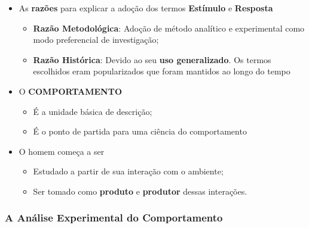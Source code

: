 \documentclass[
]{book}
\providecommand{\tightlist}{%
  \setlength{\itemsep}{0pt}\setlength{\parskip}{0pt}}
\begin{document}
\begin{itemize}
\tightlist
\item
  As \textbf{razões} para explicar a adoção dos termos \textbf{Estímulo}
  e \textbf{Resposta}

  \begin{itemize}
  \tightlist
  \item
    \textbf{Razão Metodológica}: Adoção de método analítico e
    experimental como modo preferencial de investigação;
  \item
    \textbf{Razão Histórica}: Devido ao seu \textbf{uso generalizado}.
    Os termos escolhidos eram popularizados que foram mantidos ao longo
    do tempo
  \end{itemize}
\item
  O \textbf{COMPORTAMENTO}

  \begin{itemize}
  \tightlist
  \item
    É a unidade básica de descrição;
  \item
    É o ponto de partida para uma ciência do comportamento
  \end{itemize}
\item
  O homem começa a ser

  \begin{itemize}
  \tightlist
  \item
    Estudado a partir de sua interação com o ambiente;
  \item
    Ser tomado como \textbf{produto} e \textbf{produtor} dessas
    interações.
  \end{itemize}
\end{itemize}

\hypertarget{a-anuxe1lise-experimental-do-comportamento}{%
\subsubsection{A Análise Experimental do
Comportamento}\label{a-anuxe1lise-experimental-do-comportamento}}
\end{document}
